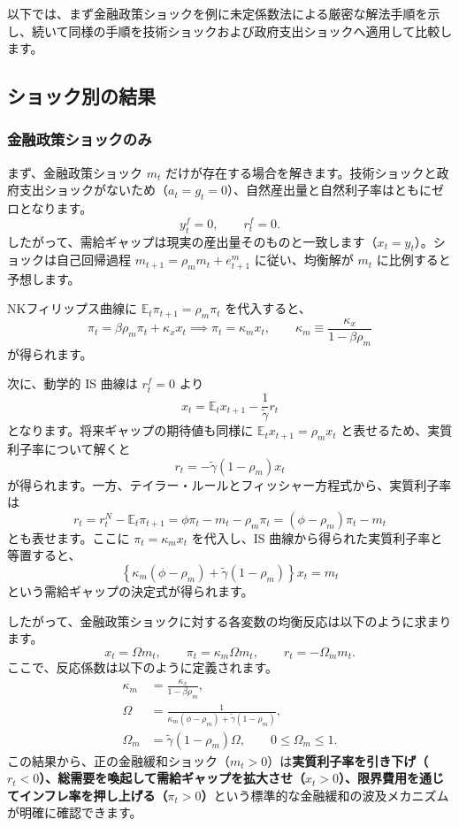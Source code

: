 \documentclass[
  japanese,
  lualatex,
  ja=standard,
  12pt,
  a4paper]{ltjsarticle}
\begin{document}
以下では、まず金融政策ショックを例に未定係数法による厳密な解法手順を示し、続いて同様の手順を技術ショックおよび政府支出ショックへ適用して比較します。

\Needspace{0.52\textheight}

\subsection{ショック別の結果}\label{ux30b7ux30e7ux30c3ux30afux5225ux306eux7d50ux679c}

\subsubsection{金融政策ショックのみ}\label{ux91d1ux878dux653fux7b56ux30b7ux30e7ux30c3ux30afux306eux307f}

まず、金融政策ショック \(m_t\)
だけが存在する場合を解きます。技術ショックと政府支出ショックがないため（\(a_t=g_t=0\)）、自然産出量と自然利子率はともにゼロとなります。
\[
y_t^f=0,
\qquad
r_t^f=0.
\]
したがって、需給ギャップは現実の産出量そのものと一致します（\(x_t=y_t\)）。ショックは自己回帰過程
\(m_{t+1}=\rho_m m_t+e_{t+1}^m\) に従い、均衡解が \(m_t\)
に比例すると予想します。

\Needspace{0.20\textheight}

NKフィリップス曲線に \(\mathbb{E}_t \pi_{t+1}=\rho_m \pi_t\)
を代入すると、 \[
\pi_t
=
\beta\rho_m\pi_t+\kappa_x x_t
\implies
\pi_t=\kappa_m x_t,
\qquad
\kappa_m\equiv\frac{\kappa_x}{1-\beta\rho_m}
\] が得られます。

次に、動学的 IS 曲線は \(r_t^f=0\) より \[
x_t
=
\mathbb{E}_t x_{t+1}
-\frac{1}{\tilde{\gamma}}r_t
\] となります。将来ギャップの期待値も同様に
\(\mathbb{E}_t x_{t+1}=\rho_m x_t\)
と表せるため、実質利子率について解くと \[
r_t
=
-\tilde{\gamma}(1-\rho_m)x_t
\]
が得られます。一方、テイラー・ルールとフィッシャー方程式から、実質利子率は
\[
r_t
=
r_t^N-\mathbb{E}_t\pi_{t+1}
=
\phi\pi_t-m_t-\rho_m\pi_t
=
(\phi-\rho_m)\pi_t-m_t
\] とも表せます。ここに \(\pi_t=\kappa_m x_t\) を代入し、IS
曲線から得られた実質利子率と等置すると、 \[
\left\{
\kappa_m(\phi-\rho_m)
+\tilde{\gamma}(1-\rho_m)
\right\}x_t
=
m_t
\] という需給ギャップの決定式が得られます。

\Needspace{0.30\textheight}

したがって、金融政策ショックに対する各変数の均衡反応は以下のように求まります。
\[
x_t = \Omega m_t,
\qquad
\pi_t = \kappa_m \Omega m_t,
\qquad
r_t = -\Omega_m m_t.
\] ここで、反応係数は以下のように定義されます。 \[
\begin{aligned}
\kappa_m
&=\frac{\kappa_x}{1-\beta\rho_m},\\
\Omega
&=
\frac{1}{\kappa_m(\phi-\rho_m)+\tilde{\gamma}(1-\rho_m)},\\
\Omega_m
&=\tilde{\gamma}(1-\rho_m)\Omega,
\qquad
0\leq\Omega_m\leq1.
\end{aligned}
\]
この結果から、正の金融緩和ショック（\(m_t>0\)）は\textbf{実質利子率を引き下げ（\(r_t<0\)）、総需要を喚起して需給ギャップを拡大させ（\(x_t>0\)）、限界費用を通じてインフレ率を押し上げる（\(\pi_t>0\)）}という標準的な金融緩和の波及メカニズムが明確に確認できます。
\end{document}
